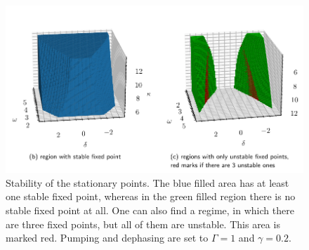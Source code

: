 \begin{figure}[H]
    \hspace*{-1.2cm}
    \includegraphics{pictures/stability_regions_2plots.pdf}
    \caption{Stability of the stationary points. The blue filled area has at least one stable fixed point, whereas in the green filled region there is no stable fixed point at all. One can also find a regime, in which there are three fixed points, but all of them are unstable. This area is marked red. Pumping and dephasing are set to $\Gamma=1$ and $\gamma=0.2$.}
    \label{fig:stability_of_solutions}
\end{figure}

